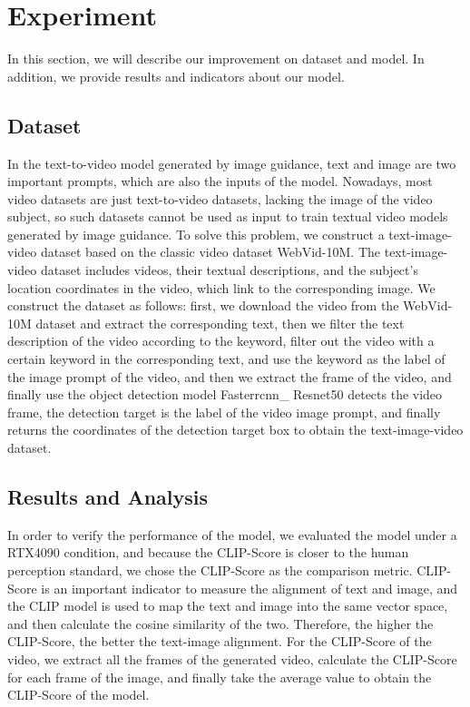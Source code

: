 \section{Experiment}
In this section, we will describe our improvement on dataset and model. In addition, we provide results and indicators about our model.

\subsection{Dataset}
In the text-to-video model generated by image guidance, text and image are two important prompts, which are also the inputs of the model. Nowadays, most video datasets are just text-to-video datasets, lacking the image of the video subject, so such datasets cannot be used as input to train textual video models generated by image guidance. To solve this problem, we construct a text-image-video dataset based on the classic video dataset WebVid-10M. The text-image-video dataset includes videos, their textual descriptions, and the subject's location coordinates in the video, which link to the corresponding image. We construct the dataset as follows: first, we download the video from the WebVid-10M dataset and extract the corresponding text, then we filter the text description of the video according to the keyword, filter out the video with a certain keyword in the corresponding text, and use the keyword as the label of the image prompt of the video, and then we extract the frame of the video, and finally use the object detection model Fasterrcnn\_ Resnet50 detects the video frame, the detection target is the label of the video image prompt, and finally returns the coordinates of the detection target box to obtain the text-image-video dataset.

\subsection{Results and Analysis}
In order to verify the performance of the model, we evaluated the model under a RTX4090 condition, and because the CLIP-Score is closer to the human perception standard, we chose the CLIP-Score as the comparison metric. CLIP-Score is an important indicator to measure the alignment of text and image, and the CLIP model is used to map the text and image into the same vector space, and then calculate the cosine similarity of the two. Therefore, the higher the CLIP-Score, the better the text-image alignment. For the CLIP-Score of the video, we extract all the frames of the generated video, calculate the CLIP-Score for each frame of the image, and finally take the average value to obtain the CLIP-Score of the model.

